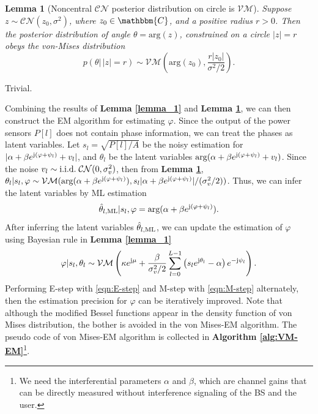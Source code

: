 \documentclass[12pt,draftclsnofoot,journal,onecolumn]{IEEEtran}
\newtheorem{lemma}{\bf Lemma}
\theoremstyle{nonumberplain}
\def \arg {\text{arg}}
\def \CN {\mathcal{CN}}
\def \VM {\mathcal{VM}}
\begin{document}
    \begin{lemma}[Noncentral $\CN$ posterior distribution on circle is $\VM$]\label{lemma_2}
        Suppose $z \sim \CN(z_0, \sigma^2)$, where $z_0 \in \mathbbm{C}$, and a positive radius $r>0$. Then the posterior distribution of angle $\theta= \arg (z)$, constrained on a circle $|z|=r$ obeys the von-Mises distribution
        \begin{equation}
            p(\theta |\, |z|=r) \sim \VM\left(\arg(z_0), \frac{r|z_0|}{\sigma^2/2}\right).
        \end{equation}
    \end{lemma}
    \begin{IEEEproof}
        Trivial.
    \end{IEEEproof}
    Combining the results of {\bf Lemma \ref{lemma_1}} and {\bf Lemma \ref{lemma_2}}, we can then construct the EM algorithm for estimating $\varphi$. Since the output of the power sensors $P[l]$ does not contain phase information, we can treat the phases as latent variables. Let $s_l = \sqrt{P[l]/A}$ be the noisy estimation for $|\alpha + \beta e^{{\rm j} (\varphi + \psi_l)} + v_l|$, and $\theta_l$ be the latent variables $\arg (\alpha + \beta e^{{\rm j} (\varphi + \psi_l)} + v_l)$. Since the noise $v_l \sim {\rm i.i.d.}\;\CN(0, \sigma_v^2)$, then from {\bf Lemma \ref{lemma_2}}, $\theta_l | s_l, \varphi \sim \VM(\arg(\alpha + \beta e^{{\rm j} (\varphi + \psi_l)}), s_l |\alpha + \beta e^{{\rm j} (\varphi + \psi_l)}|/(\sigma_v^2/2))$. Thus, we can infer the latent variables by ML estimation 
    \begin{equation}
        \hat{\theta}_{l, {\rm ML}} | s_l, \varphi = \arg(\alpha + \beta e^{{\rm j} (\varphi + \psi_l)}).
        \label{eqn:E-step}
    \end{equation}
    After inferring the latent variables $\hat{\theta}_{l, {\rm ML}}$, we can update the estimation of $\varphi$ using Bayesian rule in {\bf Lemma \ref{lemma_1}}
    \begin{equation}
        \varphi | s_l, \theta_l \sim \VM\left( \kappa e^{{\rm j} \mu} + \frac{\beta}{\sigma_v^2/2}\sum_{l=0}^{L-1}{\left(s_l e^{{\rm j}\theta_l}-\alpha\right)e^{-{\rm j} \psi_l}}\right).
        \label{eqn:M-step}
    \end{equation}
    Performing E-step with \eqref{eqn:E-step} and M-step with \eqref{eqn:M-step} alternately, then the estimation precision for $\varphi$ can be iteratively improved. Note that although the modified Bessel functions appear in the density function of von Mises distribution, the bother is avoided in the von Mises-EM algorithm. The pseudo code of von Mises-EM algorithm is collected in {\bf Algorithm \ref{alg:VM-EM}}\footnote{We need the interferential parameters $\alpha$ and $\beta$, which are channel gains that can be directly measured without interference signaling of the BS and the user. }.
\end{document}
